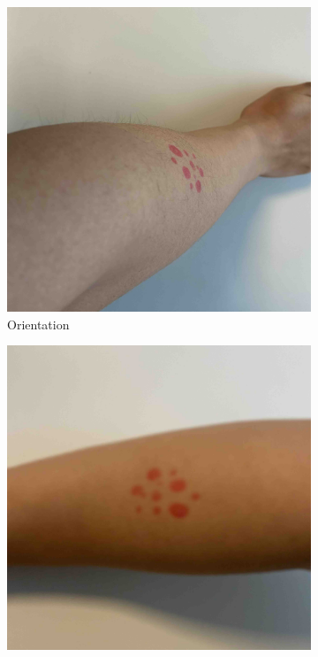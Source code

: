 \begin{figure}[ht]
    \begin{subfigure}[b]{0.24\textwidth}
        \includegraphics[width=\textwidth]{img/Orientation.jpg}
        \caption{Orientation}
        \label{fig:orientation}
    \end{subfigure}
    \hfill
    \begin{subfigure}[b]{0.24\textwidth}
        \includegraphics[width=\textwidth]{img/Focus.jpg}

\end{subfigure}
\end{figure}
